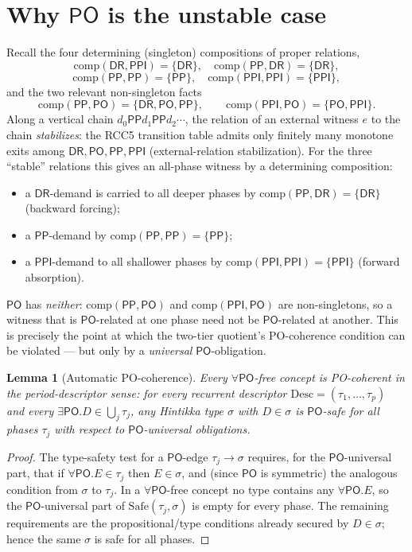 \documentclass[11pt]{article}
\newcommand{\DR}{\mathsf{DR}}
\newcommand{\PO}{\mathsf{PO}}
\newcommand{\PP}{\mathsf{PP}}
\newcommand{\PPI}{\mathsf{PPI}}
\newcommand{\Comp}{\mathrm{comp}}
\theoremstyle{plain}
\newtheorem{lemma}[theorem]{Lemma}
\theoremstyle{definition}
\begin{document}
\section{Why $\PO$ is the unstable case}

Recall the four determining (singleton) compositions of proper
relations,
\[
\Comp(\DR,\PPI)=\{\DR\},\quad
\Comp(\PP,\DR)=\{\DR\},
\]
\[
\Comp(\PP,\PP)=\{\PP\},\quad
\Comp(\PPI,\PPI)=\{\PPI\},
\]
and the two relevant non-singleton facts
\[
\Comp(\PP,\PO)=\{\DR,\PO,\PP\},\qquad
\Comp(\PPI,\PO)=\{\PO,\PPI\}.
\]
Along a vertical chain $d_0\mathbin{\PP}d_1\mathbin{\PP}d_2\cdots$, the
relation of an external witness $e$ to the chain \emph{stabilizes}: the
RCC5 transition table admits only finitely many monotone exits among
$\DR,\PO,\PP,\PPI$ (external-relation stabilization). For the three
``stable'' relations this gives an all-phase witness by a determining
composition:
\begin{itemize}
\item a $\DR$-demand is carried to all deeper phases by
$\Comp(\PP,\DR)=\{\DR\}$ (backward forcing);
\item a $\PP$-demand by $\Comp(\PP,\PP)=\{\PP\}$;
\item a $\PPI$-demand to all shallower phases by
$\Comp(\PPI,\PPI)=\{\PPI\}$ (forward absorption).
\end{itemize}
$\PO$ has \emph{neither}: $\Comp(\PP,\PO)$ and $\Comp(\PPI,\PO)$ are
non-singletons, so a witness that is $\PO$-related at one phase need not
be $\PO$-related at another. This is precisely the point at which the
two-tier quotient's PO-coherence condition can be violated --- but only
by a \emph{universal} $\PO$-obligation.

\begin{lemma}[Automatic PO-coherence]\label{lem:pocoh}
Every $\forall\PO$-free concept is PO-coherent in the period-descriptor
sense: for every recurrent descriptor $\mathrm{Desc}=(\tau_1,\dots,
\tau_p)$ and every $\exists\PO.D\in\bigcup_j\tau_j$, any Hintikka type
$\sigma$ with $D\in\sigma$ is $\PO$-safe for all phases $\tau_j$ with
respect to $\PO$-universal obligations.
\end{lemma}

\begin{proof}
The type-safety test for a $\PO$-edge $\tau_j\to\sigma$ requires, for the
$\PO$-universal part, that if $\forall\PO.E\in\tau_j$ then $E\in\sigma$,
and (since $\PO$ is symmetric) the analogous condition from $\sigma$ to
$\tau_j$. In a $\forall\PO$-free concept no type contains any
$\forall\PO.E$, so the $\PO$-universal part of $\mathrm{Safe}(\tau_j,
\sigma)$ is empty for every phase. The remaining requirements are the
propositional/type conditions already secured by $D\in\sigma$; hence the
same $\sigma$ is safe for all phases.
\end{proof}
\end{document}
